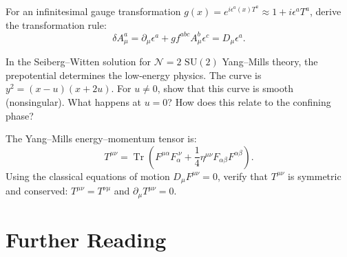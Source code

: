 \begin{exercise}
\label{ex:gauge-trans-inf}
For an infinitesimal gauge transformation $g(x) = e^{i\epsilon^a(x)T^a} \approx 1 + i\epsilon^a T^a$, derive the transformation rule:
\[
\delta A_\mu^a = \partial_\mu \epsilon^a + g f^{abc} A_\mu^b \epsilon^c = D_\mu \epsilon^a.
\]
\end{exercise}

\begin{exercise}
\label{ex:seiberg-witten}
In the Seiberg--Witten solution for $\mathcal{N} = 2$ $\mathrm{SU}(2)$ Yang--Mills theory, the prepotential determines the low-energy physics. The curve is $y^2 = (x - u)(x + 2u)$. For $u \ne 0$, show that this curve is smooth (nonsingular). What happens at $u = 0$? How does this relate to the confining phase?
\end{exercise}

\begin{exercise}
\label{ex:energy-momentum-tensor}
The Yang--Mills energy--momentum tensor is:
\[
T^{\mu\nu} = \operatorname{Tr}\left(F^{\mu\alpha}F_\alpha^{\;\nu} + \frac{1}{4}\eta^{\mu\nu}F_{\alpha\beta}F^{\alpha\beta}\right).
\]
Using the classical equations of motion $D_\mu F^{\mu\nu} = 0$, verify that $T^{\mu\nu}$ is symmetric and conserved: $T^{\mu\nu} = T^{\nu\mu}$ and $\partial_\mu T^{\mu\nu} = 0$.
\end{exercise}

\section{Further Reading}

